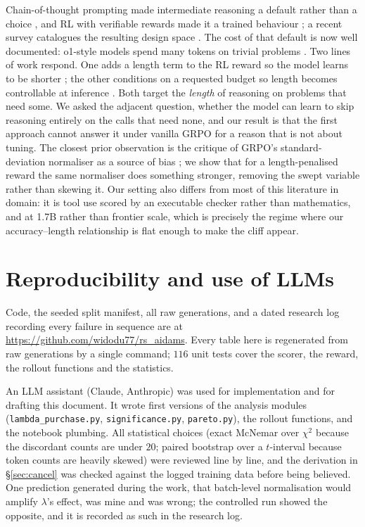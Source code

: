 \documentclass[10pt,twocolumn]{article}
\newcommand{\lam}{\lambda}
\begin{document}
Chain-of-thought prompting made intermediate reasoning a default rather than a
choice \cite{wei2022cot}, and RL with verifiable rewards made it a trained
behaviour \cite{guo2025deepseekr1}; a recent survey catalogues the resulting
design space \cite{zhang2025survey}. The cost of that default is now well
documented: o1-style models spend many tokens on trivial problems
\cite{chen2024overthinking}. Two lines of work respond. One adds a length term to
the RL reward so the model learns to be shorter \cite{arora2025efficient}; the
other conditions on a requested budget so length becomes controllable at
inference \cite{aggarwal2025l1}. Both target the \emph{length} of reasoning on
problems that need some. We asked the adjacent question, whether the model can
learn to skip reasoning entirely on the calls that need none, and our result is
that the first approach cannot answer it under vanilla GRPO for a reason that is
not about tuning. The closest prior observation is the critique of GRPO's
standard-deviation normaliser as a source of bias \cite{liu2025drgrpo}; we show
that for a length-penalised reward the same normaliser does something stronger,
removing the swept variable rather than skewing it. Our setting also differs from
most of this literature in domain: it is tool use scored by an executable
checker \cite{bfcl,patil2023gorilla} rather than mathematics, and at 1.7B rather
than frontier scale, which is precisely the regime where our accuracy--length
relationship is flat enough to make the cliff appear.

\section{Reproducibility and use of LLMs}

Code, the seeded split manifest, all raw generations, and a dated research log
recording every failure in sequence are at
\url{https://github.com/widodu77/rs_aidams}. Every table here is regenerated from
raw generations by a single command; $116$ unit tests cover the scorer, the
reward, the rollout functions and the statistics.

An LLM assistant (Claude, Anthropic) was used for implementation and for drafting
this document. It wrote first versions of the analysis modules
(\texttt{lambda\_purchase.py}, \texttt{significance.py}, \texttt{pareto.py}), the
rollout functions, and the notebook plumbing. All statistical choices (exact
McNemar over $\chi^2$ because the discordant counts are under $20$; paired
bootstrap over a $t$-interval because token counts are heavily skewed) were
reviewed line by line, and the derivation in \S\ref{sec:cancel} was checked
against the logged training data before being believed. One prediction generated
during the work, that batch-level normalisation would amplify $\lam$'s effect,
was mine and was wrong; the controlled run showed the opposite, and it is
recorded as such in the research log.



\end{document}
